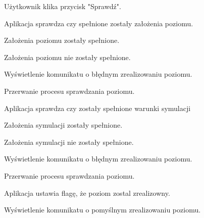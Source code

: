 \documentclass[12pt,a4paper]{article} %
\begin{document}
\hfill \break
\begin{usecase}
	\noaka
	\addpath
	\begin{usecases}
		\item Użytkownik klika przycisk "Sprawdź".
		\item Aplikacja sprawdza czy spełnione zostały założenia poziomu.
		\item Założenia poziomu zostały spełnione.
		\begin{usecases}
			\item Założenia poziomu nie zostały spełnione.
			\begin{usecases}
				\item Wyświetlenie komunikatu o błędnym zrealizowaniu poziomu.
				\item Przerwanie procesu sprawdzania poziomu.
			\end{usecases}
		\end{usecases}
		\item Aplikacja sprawdza czy zostały spełnione warunki symulacji
		\item Założenia symulacji zostały spełnione.
		\begin{usecases}
			\item Założenia symulacji nie zostały spełnione.
			\begin{usecases}
				\item Wyświetlenie komunikatu o błędnym zrealizowaniu poziomu.
				\item Przerwanie procesu sprawdzania poziomu.
			\end{usecases}
		\end{usecases}
		\item Aplikacja ustawia flagę, że poziom zostal zrealizowny.
		\item Wyświetlenie komunikatu o pomyślnym zrealizowaniu poziomu.
	\end{usecases}
\end{usecase}
\end{document}
